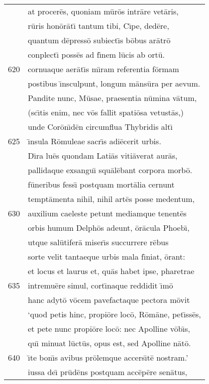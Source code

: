 \documentclass[paper=6in:9in,pagesize=pdftex,
               headinclude=on,footinclude=on,12pt]{scrbook}
\begin{document}
\begin{longtable}[p]{ r l }
 & at procer\=es, quoniam m\=ur\=os intr\=are vet\=aris,\\ 
 & r\=uris hon\=or\=at\={\i} tantum tibi, C\={\i}pe, ded\=ere,\\ 
 & quantum d\=epress\=o subiect\={\i}s b\=obus ar\=atr\=o\\ 
 & conplect\={\i} poss\=es ad f\={\i}nem l\=ucis ab ort\=u.\\ 
620 & cornuaque aer\=at\={\i}s m\={\i}ram referentia f\=ormam\\ 
 & postibus \={\i}nsculpunt, longum m\=ans\=ura per aevum.\\ 
 & \indent Pandite nunc, M\=usae, praesentia n\=umina v\=atum,\\ 
 & (sc\={\i}tis enim, nec v\=os fallit spati\=osa vetust\=as,)\\ 
 & unde Cor\=on\={\i}d\=en circumflua Thybridis alt\={\i}\\ 
625 & \={\i}nsula R\=omuleae sacr\={\i}s adi\=ecerit urbis.\\ 
 & \indent D\={\i}ra lu\=es quondam Lati\=as viti\=averat aur\=as,\\ 
 & pallidaque exsangu\={\i} squ\=al\=ebant corpora morb\=o.\\ 
 & f\=uneribus fess\={\i} postquam mort\=alia cernunt\\ 
 & tempt\=amenta nihil, nihil art\=es posse medentum,\\ 
630 & auxilium caeleste petunt mediamque tenent\=es\\ 
 & orbis humum Delph\=os adeunt, \=or\=acula Phoeb\={\i},\\ 
 & utque sal\=utifer\=a miser\={\i}s succurrere r\=ebus\\ 
 & sorte velit tantaeque urbis mala f\={\i}niat, \=orant:\\ 
 & et locus et laurus et, qu\=as habet ipse, pharetrae\\ 
635 & intremu\=ere simul, cort\={\i}naque reddidit \={\i}m\=o\\ 
 & hanc adyt\=o v\=ocem pavefactaque pectora m\=ovit\\ 
 & `quod petis hinc, propi\=ore loc\=o, R\=om\=ane, pet\={\i}ss\=es,\\ 
 & et pete nunc propi\=ore loc\=o: nec Apolline v\=ob\={\i}s,\\ 
 & qu\={\i} minuat l\=uct\=us, opus est, sed Apolline n\=at\=o.\\ 
640 & \={\i}te bon\={\i}s avibus pr\=olemque accers\={\i}t\=e nostram.'\\ 
 & iussa de\={\i} pr\=ud\=ens postquam acc\=ep\=ere sen\=atus,\\ 

\end{longtable}
\end{document}

